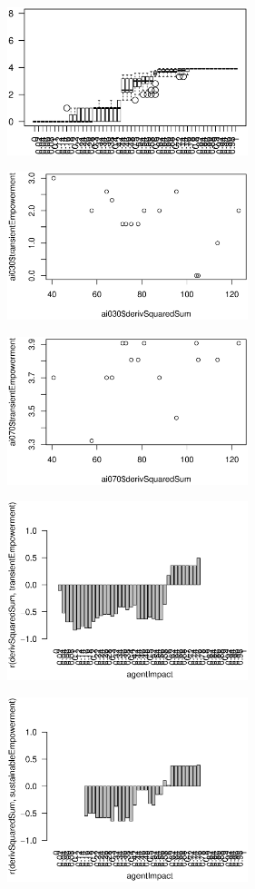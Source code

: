 \documentclass[conference]{IEEEtran}
\begin{document}
\centerline{\includegraphics[width=7cm]{n08_full_large_empsust.eps}}

\centerline{\includegraphics[width=7cm]{n08_full_large_corr_dss_emp_ai030.eps}}

\centerline{\includegraphics[width=7cm]{n08_full_large_corr_dss_emp_ai070.eps}}

\centerline{\includegraphics[width=7cm]{n08_full_large_corr_dss_emp.eps}}

\centerline{\includegraphics[width=7cm]{n08_full_large_corr_dss_empsust.eps}}
\end{document}
